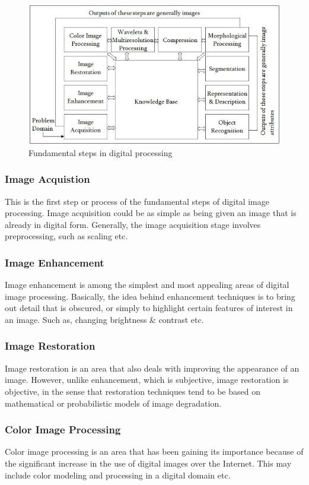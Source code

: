         \begin{figure}[H]
            \centering
            \includegraphics[width=0.6\linewidth]{img/IP.jpg}
            \caption{Fundamental steps in digital processing}
        \end{figure}
        \subsubsection{Image Acquistion}
            This is the first step or process of the fundamental steps of digital image processing. Image acquisition could 
            be as simple as being given an image that is already in digital form. Generally, the image acquisition stage involves 
            preprocessing, such as scaling etc.
        \subsubsection{Image Enhancement}
            Image enhancement is among the simplest and most appealing areas of digital image processing. Basically, the idea behind 
            enhancement techniques is to bring out detail that is obscured, or simply to highlight certain features of interest in an 
            image. Such as, changing brightness \& contrast etc.
        \subsubsection{Image Restoration}
            Image restoration is an area that also deals with improving the appearance of an image. However, unlike enhancement, 
            which is subjective, image restoration is objective, in the sense that restoration techniques tend to be based on mathematical 
            or probabilistic models of image degradation.
        \subsubsection{Color Image Processing}
            Color image processing is an area that has been gaining its importance because of the significant increase in the use of digital 
            images over the Internet. This may include color modeling and processing in a digital domain etc.
